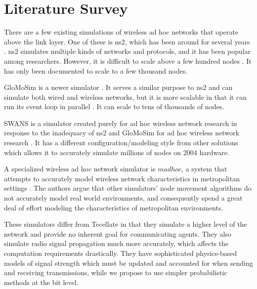 \section{Literature Survey}

There are a few existing simulations of wireless ad hoc networks that operate above the link layer. One of these is ns2, which has been around for several years \cite{ns2}. ns2 simulates multiple kinds of networks and protocols, and it has been popular among researchers. However, it is difficult to scale above a few hundred nodes \cite{swans}. It has only been documented to scale to a few thousand nodes.

GloMoSim is a newer simulator \cite{glomosim}. It serves a similar purpose to ns2 and can simulate both wired and wireless networks, but it is more scalable in that it can run its event loop in parallel \cite{swans}. It can scale to tens of thousands of nodes.

SWANS is a simulator created purely for ad hoc wireless network research in response to the inadequacy of ns2 and GloMoSim for ad hoc wireless network research \cite{swans}. It has a different configuration/modeling style from other solutions which allows it to accurately simulate millions of nodes on 2004 hardware.

A specialized wireless ad hoc network simulator is $madhoc$, a system that attempts to accurately model wireless network characteristics in metropolitan settings \cite{madhoc}. The authors argue that other simulators' node movement algorithms do not accurately model real world environments, and consequently spend a great deal of effort modeling the characteristics of metropolitan environments.

These simulators differ from Tecellate in that they simulate a higher level of the network and provide no inherent goal for communicating agents. They also simulate radio signal propagation much more accurately, which affects the computation requirements drastically. They have sophisticated physics-based models of signal strength which must be updated and accounted for when sending and receiving transmissions, while we propose to use simpler probabilistic methods at the bit level.
